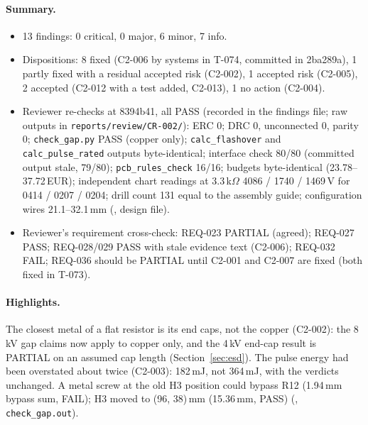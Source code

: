 \paragraph{Summary.}
\begin{itemize}[noitemsep]
  \item 13 findings: 0 critical, 0 major, 6 minor, 7 info.
  \item Dispositions: 8 fixed (C2-006 by systems in T-074, committed in 2ba289a),
        1 partly fixed with a residual accepted risk (C2-002), 1 accepted risk
        (C2-005), 2 accepted (C2-012 with a test added, C2-013), 1 no action
        (C2-004).
  \item Reviewer re-checks at 8394b41, all PASS (recorded in the findings file;
        raw outputs in \nolinkurl{reports/review/CR-002/}): ERC 0; DRC 0,
        unconnected 0, parity 0; \nolinkurl{check_gap.py} PASS (copper only);
        \nolinkurl{calc_flashover} and \nolinkurl{calc_pulse_rated} outputs
        byte-identical; interface check 80/80 (committed output stale, 79/80);
        \nolinkurl{pcb_rules_check} 16/16; budgets byte-identical
        (23.78--37.72\,EUR); independent chart readings at 3.3\,k$\Omega$ 4086 /
        1740 / 1469\,V for 0414 / 0207 / 0204; drill count 131 equal to the
        assembly guide; configuration wires 21.1--32.1\,mm (,
        design file).
  \item Reviewer's requirement cross-check: REQ-023 PARTIAL (agreed); REQ-027
        PASS; REQ-028/029 PASS with stale evidence text (C2-006); REQ-032 FAIL;
        REQ-036 should be PARTIAL until C2-001 and C2-007 are fixed (both fixed
        in T-073).
\end{itemize}

\paragraph{Highlights.} The closest metal of a flat resistor is its end caps, not
the copper (C2-002): the 8\,kV gap claims now apply to copper only, and the 4\,kV
end-cap result is PARTIAL on an assumed cap length (Section~\ref{sec:esd}). The
pulse energy had been overstated about twice (C2-003): 182\,mJ, not 364\,mJ, with
the verdicts unchanged. A metal screw at the old H3 position could bypass R12
(1.94\,mm bypass sum, FAIL); H3 moved to (96, 38)\,mm (15.36\,mm, PASS)
(, \nolinkurl{check_gap.out}).


